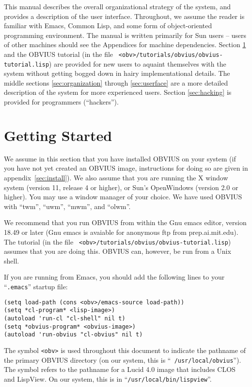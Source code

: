 This manual describes the overall organizational strategy of the
system, and provides a description of the user interface.  Throughout,
we assume the reader is familiar with Emacs, Common Lisp, and some
form of object-oriented programming environment.  The manual is
written primarily for Sun users -- users of other machines should see
the Appendices for machine dependencies.  Section \ref{sec:start} and
the OBVIUS tutorial  (in the file {\tt
<obv>/tutorials/obvius/obvius-tutorial.lisp}) are provided for new
users to aquaint themselves with the system without getting bogged
down in hairy implementational details.  The middle sections
\ref{sec:organization} through \ref{sec:userface} are a more detailed
description of the system for more experienced users.  Section
\ref{sec:hacking} is provided for programmers (``hackers'').

\newpage

\section{Getting Started}
\label{sec:start}

We assume in this section that you have installed OBVIUS on your
system (if you have not yet created an OBVIUS image, instructions for
doing so are given in appendix~\ref{sec:install}).  We also assume
that you are running the X window system (version 11, release 4 or
higher), or Sun's OpenWindows (version 2.0 or higher).  You may use a
window manager of your choice.  We have used OBVIUS with ``twm'',
``uwm'', ``mwm'', and ``olwm''.

We recommend that you run OBVIUS from within the Gnu emacs editor,
version 18.49 or later (Gnu emacs is avaiable for anonymous ftp from
prep.ai.mit.edu).  The tutorial (in the file {\tt
<obv>/tutorials/obvius/obvius-tutorial.lisp}) assumes that you are
doing this.  OBVIUS can, however, be run from a Unix shell.

If you are running from Emacs, you should add the following
lines to your ``{\tt .emacs}'' startup file:
\begin{verbatim}
(setq load-path (cons <obv>/emacs-source load-path))
(setq *cl-program* <lisp-image>)
(autoload 'run-cl "cl-shell" nil t)
(setq *obvius-program* <obvius-image>)
(autoload 'run-obvius "cl-obvius" nil t)
\end{verbatim}
The symbol {\tt <obv>} is used throughout this document to indicate the
pathname of the primary OBVIUS directory (on our system, this is ``{\tt
/usr/local/obvius}'').  The symbol {\tt <lisp-image>} refers to the
pathname for a Lucid 4.0 image that includes CLOS and LispView.  On
our system, this is in ``{\tt /usr/local/bin/lispview}''.

